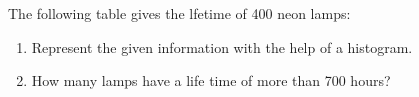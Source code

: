 The following table gives the lfetime of 400 neon lamps:
\begin{table}[ht!]
\centering

\label{table:Q41}	
\end{table}
\begin{enumerate}
\item Represent the given information with the
help of a histogram.
\item How many lamps have a life time of more
than 700 hours?
\end{enumerate}
